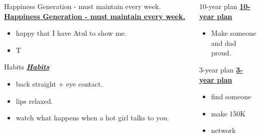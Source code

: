 \ifdefined\POSTER
  \begin{columns}
   \begin{column}{0.22\columnwidth}
      \begin{block}{Happiness Generation - must maintain every week.}
\else
 \underline{\bf Happiness Generation - must maintain every week.} 
\fi
        \begin{itemize}
          \tiny \item \tiny happy that I have Atul to show me.  
          \item \tiny T 
        \end{itemize}
\ifdefined\POSTER
      \end{block}
\fi

\ifdefined\POSTER
    \begin{block}{Habits}
\else
 \underline{\bf \it Habits} 
\fi 
      \begin{itemize} 
        \tiny \item \tiny back straight + eye contact. 
      \item \tiny lips relaxed. 
      \item \tiny watch what happens when a hot girl talks to you. 
      \end{itemize}
\ifdefined\POSTER
    \end{block} 
  \end{column} %
\fi

\ifdefined\POSTER
  \begin{column}{0.5\columnwidth}
    \begin{block}{10-year plan}   %
\else 
 \underline{\bf 10-year plan}
\fi
      \begin{itemize}
      \item \small Make someone and dad proud.
      \end{itemize}
\ifdefined\POSTER
    \end{block}
\fi

\ifdefined\POSTER 
    \begin{block}{3-year plan}
\else
\underline{\bf 3-year plan} 
\fi
      \begin{itemize}
      \item \small find someone
      \item \small make 150K
      \item \small network
      \end{itemize}
\ifdefined\POSTER
    \end{block} 
\fi


\end{column}
\end{columns}
